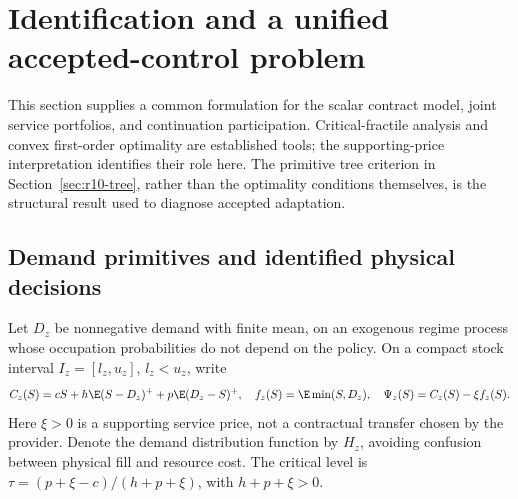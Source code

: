 \section{Identification and a unified accepted-control problem}\label{sec:r10-general}
This section supplies a common formulation for the scalar contract model, joint service portfolios, and continuation participation. Critical-fractile analysis and convex first-order optimality are established tools; the supporting-price interpretation identifies their role here. The primitive tree criterion in Section~\ref{sec:r10-tree}, rather than the optimality conditions themselves, is the structural result used to diagnose accepted adaptation.

\subsection{Demand primitives and identified physical decisions}
Let $D_z$ be nonnegative demand with finite mean, on an exogenous regime process whose occupation probabilities do not depend on the policy. On a compact stock interval $I_z=[l_z,u_z]$, $l_z<u_z$, write
\[
 C_z(S)=cS+h\E(S-D_z)^++p\E(D_z-S)^+,\quad
 f_z(S)=\E\min(S,D_z),\quad \Psi_z(S)=C_z(S)-\xi f_z(S).
\]
Here $\xi>0$ is a supporting service price, not a contractual transfer chosen by the provider. Denote the demand distribution function by $H_z$, avoiding confusion between physical fill and resource cost. The critical level is $\tau=(p+\xi-c)/(h+p+\xi)$, with $h+p+\xi>0$.

